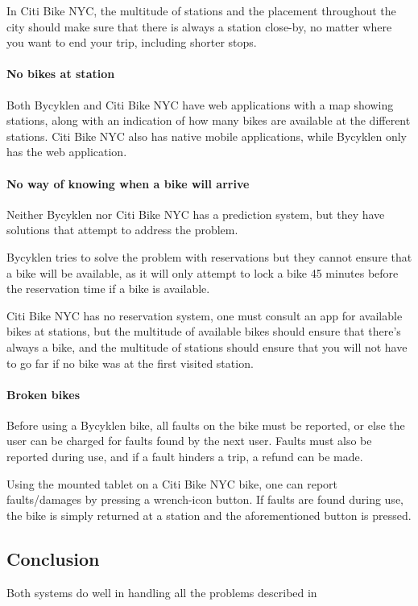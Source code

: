 In Citi Bike NYC, the multitude of stations and the placement throughout the city should make sure that there is always a station close-by, no matter where you want to end your trip, including shorter stops.

\paragraph{No bikes at station}
Both Bycyklen and Citi Bike NYC have web applications with a map showing stations, along with an indication of how many bikes are available at the different stations.
Citi Bike NYC also has native mobile applications, while Bycyklen only has the web application.

\paragraph{No way of knowing when a bike will arrive}
Neither Bycyklen nor Citi Bike NYC has a prediction system, but they have solutions that attempt to address the problem.

Bycyklen tries to solve the problem with reservations but they cannot ensure that a bike will be available, as it will only attempt to lock a bike 45 minutes before the reservation time if a bike is available.

Citi Bike NYC has no reservation system, one must consult an app for available bikes at stations, but the multitude of  available bikes should ensure that there's always a bike, and the multitude of stations should ensure that you will not have to go far if no bike was at the first visited station.

\paragraph{Broken bikes}
Before using a Bycyklen bike, all faults on the bike must be reported, or else the user can be charged for faults found by the next user.
Faults must also be reported during use, and if a fault hinders a trip, a refund can be made.

Using the mounted tablet on a Citi Bike NYC bike, one can report faults/damages by pressing a wrench-icon button.
If faults are found during use, the bike is simply returned at a station and the aforementioned button is pressed.

\subsection{Conclusion}
Both systems do well in handling all the problems described in 

